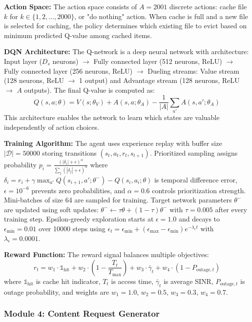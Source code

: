 \documentclass[12pt,a4paper]{article}
\begin{document}
\textbf{Action Space:} The action space consists of $A = 2001$ discrete actions: cache file $k$ for $k \in \{1, 2, \ldots, 2000\}$, or "do nothing" action. When cache is full and a new file is selected for caching, the policy determines which existing file to evict based on minimum predicted Q-value among cached items.

\textbf{DQN Architecture:} The Q-network is a deep neural network with architecture: Input layer ($D_s$ neurons) $\rightarrow$ Fully connected layer (512 neurons, ReLU) $\rightarrow$ Fully connected layer (256 neurons, ReLU) $\rightarrow$ Dueling streams: Value stream (128 neurons, ReLU $\rightarrow$ 1 output) and Advantage stream (128 neurons, ReLU $\rightarrow$ $A$ outputs). The final Q-value is computed as:
\[
Q(s,a;\theta) = V(s;\theta_V) + A(s,a;\theta_A) - \frac{1}{|A|}\sum_{a'} A(s,a';\theta_A)
\]
This architecture enables the network to learn which states are valuable independently of action choices.

\textbf{Training Algorithm:} The agent uses experience replay with buffer size $|\mathcal{D}| = 50000$ storing transitions $(s_t, a_t, r_t, s_{t+1})$. Prioritized sampling assigns probability $p_i = \frac{(|\delta_i| + \epsilon)^\alpha}{\sum_j (|\delta_j| + \epsilon)^\alpha}$ where $\delta_i = r_i + \gamma \max_{a'} Q(s_{i+1}, a'; \theta^-) - Q(s_i, a_i; \theta)$ is temporal difference error, $\epsilon = 10^{-6}$ prevents zero probabilities, and $\alpha = 0.6$ controls prioritization strength. Mini-batches of size 64 are sampled for training. Target network parameters $\theta^-$ are updated using soft updates: $\theta^- \leftarrow \tau \theta + (1-\tau)\theta^-$ with $\tau = 0.005$ after every training step. Epsilon-greedy exploration starts at $\epsilon = 1.0$ and decays to $\epsilon_{\min} = 0.01$ over 10000 steps using $\epsilon_t = \epsilon_{\min} + (\epsilon_{\max} - \epsilon_{\min})e^{-\lambda_\epsilon t}$ with $\lambda_\epsilon = 0.0001$.

\textbf{Reward Function:} The reward signal balances multiple objectives:
\[
r_t = w_1 \cdot \mathbb{1}_{\text{hit}} + w_2 \cdot (1 - \frac{T_t}{T_{\max}}) + w_3 \cdot \bar{\gamma}_t + w_4 \cdot (1 - P_{\text{outage},t})
\]
where $\mathbb{1}_{\text{hit}}$ is cache hit indicator, $T_t$ is access time, $\bar{\gamma}_t$ is average SINR, $P_{\text{outage},t}$ is outage probability, and weights are $w_1 = 1.0$, $w_2 = 0.5$, $w_3 = 0.3$, $w_4 = 0.7$.

\subsubsection{Module 4: Content Request Generator}
\end{document}
